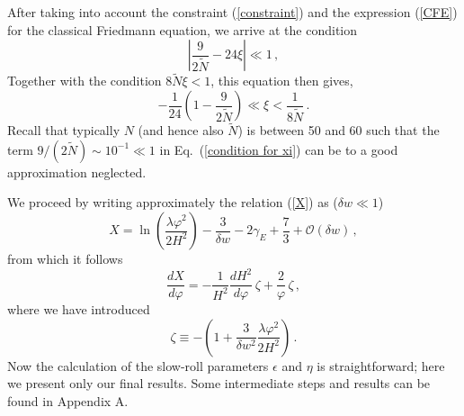 \documentclass[aps,12pt,superscriptaddress,preprintnumbers,
                secnumarabic,nofootinbib,showpacs]{revtex4}
\begin{document}
After taking into account the constraint
(\ref{constraint}) and the expression (\ref{CFE})
for the classical Friedmann equation, we arrive at the condition
\begin{equation}
\left|\frac{9}{2\tilde{N}}-24\xi\right|\ll 1
\,,
\end{equation}
Together with the condition $8\tilde N\xi<1$, this equation then gives,
\begin{equation}
-\frac{1}{24}\left(1-\frac{9}{2\tilde N}\right)
           \ll \xi < \frac{1}{8\tilde{N}}
\,.
\label{condition for xi}
\end{equation}
Recall that typically $N$ (and hence also $\tilde{N}$)
is between 50 and 60 such that the term $9/(2\tilde N)\sim 10^{-1}\ll 1$ in
Eq.~(\ref{condition for xi}) can be to a good approximation neglected.

 We proceed by writing approximately the relation (\ref{X}) as
($\delta w\ll 1$)
\begin{equation}
X = \ln\left(\frac{\lambda\varphi^2}{2H^2}\right) -
\frac{3}{\delta w} - 2\gamma_E + \frac{7}{3} + \mathcal{O}(\delta
w )\,, \label{X2}
\end{equation}
from which it follows
\begin{equation}
\frac{dX}{d\varphi} = -\frac{1}{H^2}\frac{dH^2}{d\varphi}\,\zeta +
\frac{2}{\varphi}\,\zeta\,, \label{dXdvarphi}
\end{equation}
where we have introduced
\begin{equation}
\zeta\equiv -\left(1 + \frac{3}{\delta w
^2}\frac{\lambda\varphi^2}{2H^2}\right)\,. \label{zeta}
\end{equation}
Now the calculation of the slow-roll parameters $\epsilon$ and
$\eta$ is straightforward;
here we present only our final results. Some intermediate steps
and results can be found in Appendix A.
\end{document}
